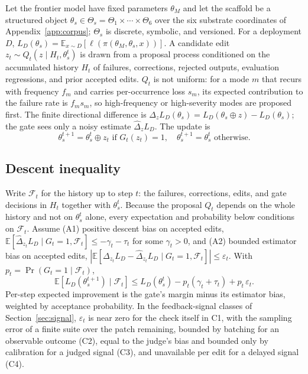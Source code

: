 Let the frontier model have fixed parameters \(\theta_M\) and let the scaffold be a structured object \(\theta_s \in \Theta_s = \Theta_1 \times \cdots \times \Theta_6\) over the six substrate coordinates of Appendix~\ref{app:corpus}; \(\Theta_s\) is discrete, symbolic, and versioned. For a deployment \(D\), \(L_D(\theta_s) = \mathbb{E}_{x \sim D}[\ell(\pi(\theta_M, \theta_s, x))]\). A candidate edit \(z_t \sim Q_t(z \mid H_t, \theta_s^t)\) is drawn from a proposal process conditioned on the accumulated history \(H_t\) of failures, corrections, rejected outputs, evaluation regressions, and prior accepted edits. \(Q_t\) is not uniform: for a mode \(m\) that recurs with frequency \(f_m\) and carries per-occurrence loss \(s_m\), its expected contribution to the failure rate is \(f_m s_m\), so high-frequency or high-severity modes are proposed first. The finite directional difference is \(\Delta_z L_D(\theta_s) = L_D(\theta_s \oplus z) - L_D(\theta_s)\); the gate sees only a noisy estimate \(\widehat{\Delta}_z L_D\). The update is \[\theta_s^{t+1} = \theta_s^t \oplus z_t \text{ if } G_t(z_t) = 1, \quad \theta_s^{t+1} = \theta_s^t \text{ otherwise.}\]

\subsection{Descent inequality}\label{descent-inequality}

Write \(\mathcal{F}_t\) for the history up to step \(t\): the failures, corrections, edits, and gate decisions in \(H_t\) together with \(\theta_s^t\). Because the proposal \(Q_t\) depends on the whole history and not on \(\theta_s^t\) alone, every expectation and probability below conditions on \(\mathcal{F}_t\). Assume (A1) positive descent bias on accepted edits, \(\mathbb{E}[\widehat{\Delta}_{z_t} L_D \mid G_t = 1, \mathcal{F}_t] \le -\gamma_t - \tau_t\) for some \(\gamma_t > 0\), and (A2) bounded estimator bias on accepted edits, \(|\mathbb{E}[\Delta_{z_t} L_D - \widehat{\Delta}_{z_t} L_D \mid G_t = 1, \mathcal{F}_t]| \le \varepsilon_t\). With \(p_t = \Pr(G_t = 1 \mid \mathcal{F}_t)\), \[\mathbb{E}[L_D(\theta_s^{t+1}) \mid \mathcal{F}_t] \le L_D(\theta_s^t) - p_t(\gamma_t + \tau_t) + p_t\,\varepsilon_t.\] Per-step expected improvement is the gate's margin minus its estimator bias, weighted by acceptance probability. In the feedback-signal classes of Section~\ref{sec:signal}, \(\varepsilon_t\) is near zero for the check itself in C1, with the sampling error of a finite suite over the patch remaining, bounded by batching for an observable outcome (C2), equal to the judge's bias and bounded only by calibration for a judged signal (C3), and unavailable per edit for a delayed signal (C4).

